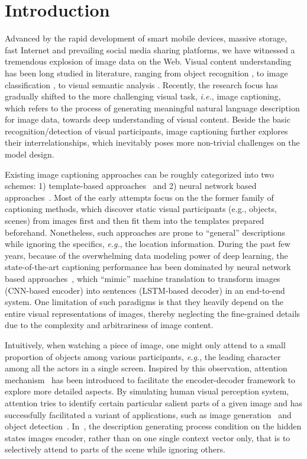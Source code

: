 \documentclass[10pt,twocolumn,letterpaper]{article}
\begin{document}
	\section{Introduction}
	Advanced by the rapid development of smart mobile devices, massive storage, fast Internet and prevailing social media sharing platforms, we have witnessed a tremendous explosion of image data on the Web. Visual content understanding has been long studied in literature, ranging from object recognition \cite{he2015deep,liang2015recurrent,dai2016r}, to image classification \cite{he2015deep,krizhevsky2012imagenet}, to visual semantic analysis \cite{yang2014exploiting,yang2015visual,zhang2014start,hong2015learning,bin2016bidirectional}. Recently, the research focus has gradually shifted to the more challenging visual task, \emph{i.e.}, image captioning, which refers to the process of generating meaningful natural language description for image data, towards deep understanding of visual content. Beside the basic recognition/detection of visual participants, image captioning further explores their interrelationships, which inevitably poses more non-trivial challenges on the model design.
	
	Existing image captioning approaches can be roughly categorized into two schemes: 1) template-based approaches~\cite{kulkarni2013babytalk} and 2) neural network based approaches~\cite{karpathy2014deep}. Most of the early attempts focus on the the former family of captioning methods, which discover static visual participants (e.g., objects, scenes) from images first and then fit them into the templates prepared beforehand. Nonetheless, such approaches are prone to ``general'' descriptions while ignoring the specifics, \emph{e.g.}, the location information. During the past few years, because of the overwhelming data modeling power of deep learning, the state-of-the-art captioning performance has been dominated by neural network based approaches~\cite{chen2015mind,donahue2015long,mao2015learning}, which ``mimic'' machine translation to transform images (CNN-based encoder) into sentences (LSTM-based decoder) in an end-to-end system. One limitation of such paradigms is that they heavily depend on the entire visual representations of images, thereby neglecting the fine-grained details due to the complexity and arbitrariness of image content.
	
	Intuitively, when watching a piece of image, one might only attend to a small proportion of objects among various participants, \emph{e.g.}, the leading character among all the actors in a single screen. Inspired by this observation, attention mechanism~\cite{xu2015show,mnih2014recurrent} has been introduced to facilitate the encoder-decoder framework to explore more detailed aspects. By simulating human visual perception system, attention tries to identify certain particular salient parts of a given image and has successfully facilitated a variant of applications, such as image generation~\cite{gregor2015draw} and object detection~\cite{zhou2015learning}. In~\cite{xu2015show}, the description generating process condition on the hidden states images encoder, rather than on one single context vector only, that is to selectively attend to parts of the scene while ignoring others.
	
\end{document}
